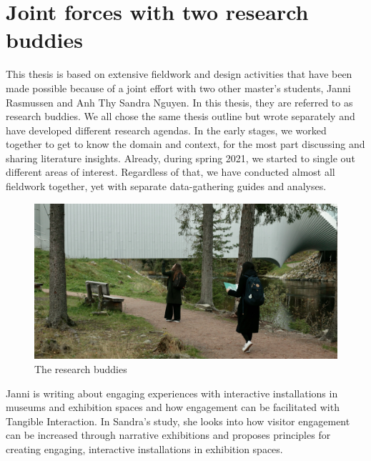 

\section{Joint forces with two research buddies}
This thesis is based on extensive fieldwork and design activities that have been made possible because of a joint effort with two other master's students, Janni Rasmussen and Anh Thy Sandra Nguyen. In this thesis, they are referred to as research buddies. We all chose the same thesis outline but wrote separately and have developed different research agendas. In the early stages, we worked together to get to know the domain and context, for the most part discussing and sharing literature insights. Already, during spring 2021, we started to single out different areas of interest. Regardless of that, we have conducted almost all fieldwork together, yet with separate data-gathering guides and analyses.

\begin{figure}[H]
\includegraphics[width=12cm]{pictures/methodology/buddies.JPG}
\caption{The research buddies}
\centering 
\end{figure}

Janni is writing about engaging experiences with interactive installations in museums and exhibition spaces and how engagement can be facilitated with Tangible Interaction. In Sandra's study, she looks into how visitor engagement can be increased through narrative exhibitions and proposes principles for creating engaging, interactive installations in exhibition spaces.


